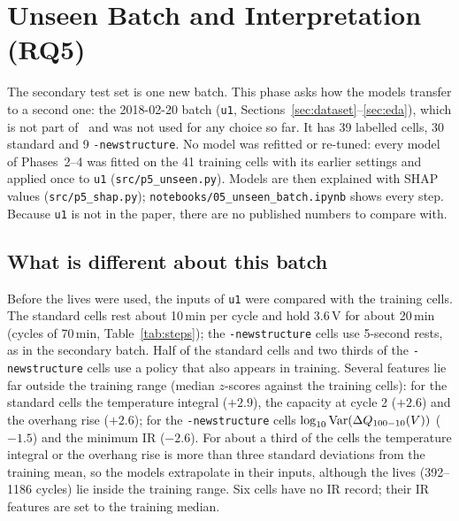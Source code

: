 \FloatBarrier
\section{Unseen Batch and Interpretation (RQ5)}
\label{sec:unseen}

The secondary test set is one new batch. This phase asks how the models
transfer to a second one: the 2018-02-20 batch (\texttt{u1},
Sections~\ref{sec:dataset}--\ref{sec:eda}), which is not part
of~\cite{severson2019} and was not used for any choice so far. It has 39
labelled cells, 30 standard and 9 \texttt{-newstructure}. No model was refitted
or re-tuned: every model of Phases~2--4 was fitted on the 41 training cells
with its earlier settings and applied once to \texttt{u1}
(\texttt{src/p5\_unseen.py}). Models are then explained with SHAP values
(\texttt{src/p5\_shap.py}); \texttt{notebooks/05\_unseen\_batch.ipynb} shows
every step. Because \texttt{u1} is not in the paper, there are no published
numbers to compare with.

\subsection{What is different about this batch}
Before the lives were used, the inputs of \texttt{u1} were compared with the
training cells. The standard cells rest about 10\,min per cycle and hold 3.6\,V
for about 20\,min (cycles of 70\,min, Table~\ref{tab:steps}); the
\texttt{-newstructure} cells use 5-second rests, as in the secondary batch. Half of
the standard cells and two thirds of the \texttt{-newstructure} cells use a
policy that also appears in training. Several features lie far outside the
training range (median $z$-scores against the training cells): for the
standard cells the temperature integral ($+2.9$), the capacity at cycle 2
($+2.6$) and the overhang rise ($+2.6$); for the \texttt{-newstructure} cells
$\log_{10}\mathrm{Var}(\Delta Q_{100-10}(V))$ ($-1.5$) and the minimum IR ($-2.6$). For about a
third of the cells the temperature integral or the overhang rise is more
than three standard deviations from the training mean, so the models
extrapolate in their inputs, although the lives (392--1186 cycles) lie inside
the training range. Six cells have no IR record; their IR features are set to
the training median.


